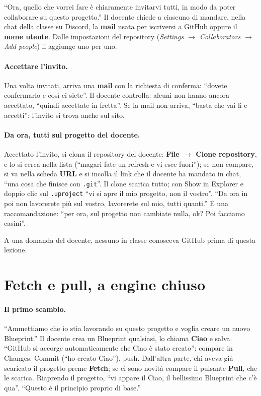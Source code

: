 ``Ora, quello che vorrei fare è chiaramente invitarvi tutti, in modo da poter
collaborare su questo progetto.'' Il docente chiede a ciascuno di mandare, nella
chat della classe su Discord, la \textbf{mail} usata per iscriversi a GitHub
oppure il \textbf{nome utente}. Dalle impostazioni del repository
(\emph{Settings $\rightarrow$ Collaborators $\rightarrow$ Add people}) li
aggiunge uno per uno.

\paragraph{Accettare l'invito.} Una volta invitati, arriva una \textbf{mail} con
la richiesta di conferma: ``dovete confermarlo e così ci siete''. Il docente
controlla: alcuni non hanno ancora accettato, ``quindi accettate in fretta''.
Se la mail non arriva, ``basta che vai lì e accetti'': l'invito si trova anche
sul sito.

\paragraph{Da ora, tutti sul progetto del docente.} Accettato l'invito, si clona
il repository del docente: \textbf{File $\rightarrow$ Clone repository}, e lo si
cerca nella lista (``magari fate un refresh e vi esce fuori''); se non compare,
si va nella scheda \textbf{URL} e si incolla il link che il docente ha mandato
in chat, ``una cosa che finisce con \texttt{.git}''. Il clone scarica tutto; con
Show in Explorer e doppio clic sul \texttt{.uproject} ``vi si apre il mio
progetto, non il vostro''. ``Da ora in poi non lavorerete più sul vostro,
lavorerete sul mio, tutti quanti.'' E una raccomandazione: ``per ora, sul
progetto non cambiate nulla, ok? Poi facciamo casini''.

A una domanda del docente, nessuno in classe conosceva GitHub prima di questa
lezione.

\section{Fetch e pull, a engine chiuso}
\label{gd13:sec:pull}

\paragraph{Il primo scambio.} ``Ammettiamo che io stia lavorando su questo
progetto e voglia creare un nuovo Blueprint.'' Il docente crea un Blueprint
qualsiasi, lo chiama \textbf{Ciao} e salva. ``GitHub si accorge automaticamente
che Ciao è stato creato'': compare in Changes. Commit (``ho creato Ciao''),
push. Dall'altra parte, chi aveva già scaricato il progetto preme
\textbf{Fetch}; se ci sono novità compare il pulsante \textbf{Pull}, che le
scarica. Riaprendo il progetto, ``vi appare il Ciao, il bellissimo Blueprint
che c'è qua''. ``Questo è il principio proprio di base.''

